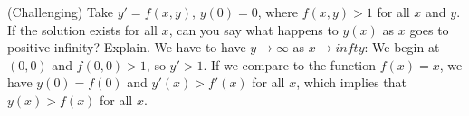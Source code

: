 {(Challenging) Take $y' = f(x,y)$, $y(0) = 0$, where $f(x,y) > 1$
for all $x$ and $y$.  If
the solution exists for all $x$, can you say
what happens to $y(x)$ as $x$ goes to positive infinity?  Explain.}
{We have to have $y\to \infty$ as $x\to infty$: We begin at $(0,0)$ and $f(0,0)>1$, so $y'>1$. If we compare to the function $f(x)=x$, we have $y(0)=f(0)$ and $y'(x)>f'(x)$ for all $x$, which implies that $y(x)>f(x)$ for all $x$.}